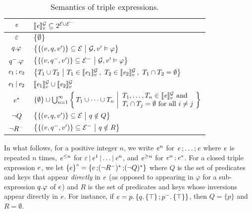 \begin{table}
  \caption{Semantics of triple expressions.}
  \label{tab:semantics-shex-triple-expr-denotational}
  \centering
  \begin{tabular}{cl}
    \toprule
    $\mathit{e}$ & $\llbracket{\mathit{e}}\rrbracket_v^{\mathcal{G}} \subseteq 2^{\mathcal{E} \cup \mathcal{E}^{-}}$ \\[2pt]
    \midrule
    $\varepsilon$ & $\{\emptyset\}$ \\[2pt]
    $q.\mathit{\varphi}$ & $\big\{\{(v, q, v')\} \subseteq \mathcal{E} \ \big|\  \mathcal{G}, v' \vDash \varphi\big\}$ \\[2pt]
    $q^{-}.\mathit{\varphi}$ & $\big\{\{(v, q^{-}, v')\} \subseteq \mathcal{E}^{-}\ \big|\ \mathcal{G}, v' \vDash \varphi\big\}$  \\[2pt]
    $\mathit{e}_1 \mathop{;} \mathit{e}_2$ & $\left\{ T_1 \cup T_2 \ \middle|\  T_1\in \llbracket{\mathit{e}_1}\rrbracket_v^{\mathcal{G}}\,,\  T_2\in \llbracket{\mathit{e}_2}\rrbracket_v^{\mathcal{G}}\,,\ T_1\cap T_2 = \emptyset \right\}$ \\[2pt]
    $\mathit{e}_1 \mathop{|} \mathit{e}_2$ & $\llbracket{\mathit{e}_1}\rrbracket_v^{\mathcal{G}} \cup \llbracket{\mathit{e}_2}\rrbracket_v^{\mathcal{G}}$ \\[2pt]
    $\mathit{e}^{*}$
    & $ \{\emptyset\} \cup \bigcup_{n=1}^\infty \left \{\, T_1 \cup \dots \cup T_n \ \bigg| \begin{array}{l}
    T_1, \dots, T_n \in \llbracket{\mathit{e}}\rrbracket_v^{\mathcal{G}} \text{ and } \\
    T_i\cap T_j = \emptyset \text{ for all } i\neq j
    \end{array} \!
    \right\}$ \\[2pt]
    $\neg Q$ & $\big\{ \{(v, q , v')\} \subseteq  \mathcal{E}\ \big|\  q\notin Q\big\}$ \\[2pt]
    $\neg{R^{-}}$ & $\big\{ \{(v, q^{-} , v')\} \subseteq  \mathcal{E}^{-}\ \big|\  q\notin R\big\}$
    \\
    \bottomrule
  \end{tabular}
\end{table}

In what follows, for a positive integer $n$, we write $\mathit{e}^n$ for $ \mathit{e} \mathop{;} \ldots \mathop{;} \mathit{e}$ where  $\mathit{e}$ is repeated $n$ times,
$\mathit{e}^{\leq n}$ for $\varepsilon \mathop{|} \mathit{e}^{1} \mathop{|} \ldots \mathop{|} \mathit{e}^{n}$, and $\mathit{e}^{\geq n}$ for $\mathit{e}^{n} \mathop{;} \mathit{e}^{*}$.
For a closed triple expression $e$, we let $\left\{ e \right\}^{\circ} = \left\{ e \mathop{;} (\neg{R^{-}})^{*} \mathop{;} (\neg Q)^{*} \right\}$ where $Q$ is the set of predicates and keys that appear \emph{directly} in $e$ (as opposed to appearing in $\varphi$ for a sub-expression $q.\mathit{\varphi}$ of $e$) and $R$ is the set of predicates and keys whose inversions appear directly in $e$. For instance, if $e = p.\left\{ q.\left\{ \top \right\}\mathop{;}p^{-}.\left\{ \top \right\} \right\}$, then $Q = \{p\}$ and $R=\emptyset$.

